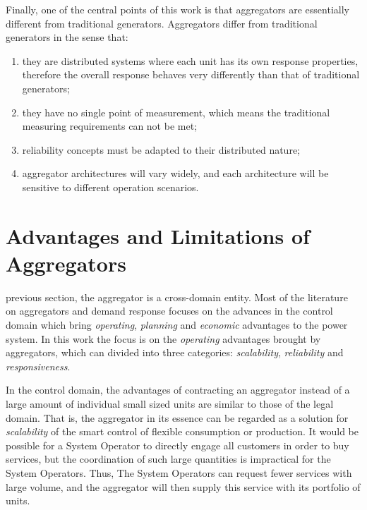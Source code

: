 Finally, one of the central points of this work is that aggregators are essentially different from traditional generators. Aggregators differ from traditional generators in the sense that:
\begin{enumerate}
	\item they are distributed systems where each unit has its own response properties, therefore the overall response behaves very differently than that of traditional generators;\label{point:aggblackbox}
	\item they have no single point of measurement, which means the traditional measuring requirements can not be met;
	\item reliability concepts must be adapted to their distributed nature;
	\item aggregator architectures will vary widely, and each architecture will be sensitive to different operation scenarios.
\end{enumerate}

\section{Advantages and Limitations of Aggregators}
 previous section, the aggregator is a cross-domain entity. Most of the literature on aggregators and demand response focuses on the advances in the control domain which bring \emph{operating}, \emph{planning} and \emph{economic} advantages to the power system. In this work the focus is on the \emph{operating} advantages brought by aggregators, which can divided into three categories: \emph{scalability}, \emph{reliability} and \emph{responsiveness}.

In the control domain, the advantages of contracting an aggregator instead of a large amount of individual small sized units are similar to those of the legal domain. That is, the aggregator in its essence can be regarded as a solution for \emph{scalability} of the smart control of flexible consumption or production. It would be possible for a System Operator to directly engage all customers in order to buy services, but the coordination of such large quantities is impractical for the System Operators. Thus, The System Operators can request fewer services with large volume, and the aggregator will then supply this service with its portfolio of units.

